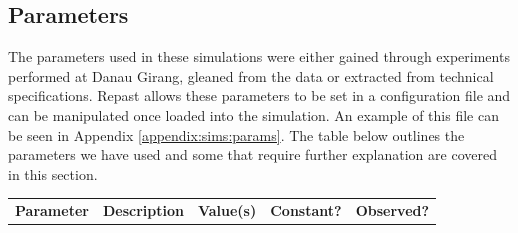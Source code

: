 \subsection{Parameters}
The parameters used in these simulations were either gained through experiments performed at Danau Girang, gleaned from the data or extracted from technical specifications. Repast allows these parameters to be set in a configuration file and can be manipulated once loaded into the simulation. An example of this file can be seen in Appendix \ref{appendix:sims:params}. The table below outlines the parameters we have used and some that require further explanation are covered in this section.
	\begin{landscape}
	\begin{table} 
	\begin{tabularx}{\textwidth}{|p{4cm}|p{10cm}|p{3cm}|p{2cm}|p{2cm}|}

	\textbf{Parameter}                      & \textbf{Description}                                                                                                        & \textbf{Value(s)}   & \textbf{Constant?} & \textbf{Observed?} \\


\end{tabularx}
\end{table}
\end{landscape}
